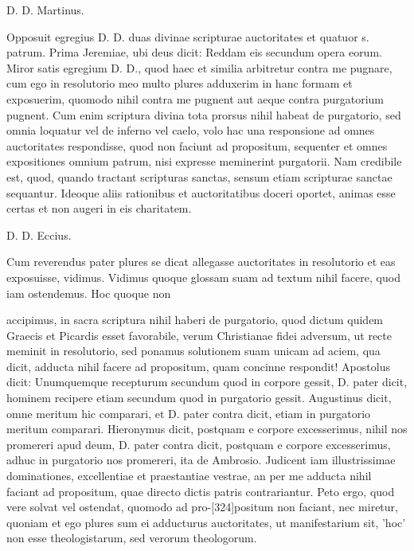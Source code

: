 D. D. Martinus.

Opposuit egregius D. D. duas divinae scripturae auctoritates et quatuor s. patrum. Prima Jeremiae, ubi deus dicit: Reddam eis secundum opera eorum. Miror satis egregium D. D., quod haec et similia arbitretur contra me pugnare, cum ego in resolutorio meo multo plures adduxerim in hanc formam et exposuerim, quomodo nihil contra me pugnent aut aeque contra purgatorium pugnent. Cum enim scriptura divina tota prorsus nihil habeat de purgatorio, sed omnia loquatur vel de inferno vel caelo, volo hac una responsione ad omnes auctoritates respondisse, quod non faciunt ad propositum, sequenter et omnes expositiones omnium patrum, nisi expresse meminerint purgatorii. Nam credibile est, quod, quando tractant scripturas sanctas, sensum etiam scripturae sanctae sequantur. Ideoque aliis rationibus et auctoritatibus doceri oportet, animas esse certas et non augeri in eis charitatem.

D. D. Eccius.

Cum reverendus pater plures se dicat allegasse auctoritates in resolutorio et eas exposuisse, vidimus. Vidimus quoque glossam suam ad textum nihil facere, quod iam ostendemus. Hoc quoque non

accipimus, in sacra scriptura nihil haberi de purgatorio, quod dictum quidem Graecis et Picardis esset favorabile, verum Christianae fidei adversum, ut recte meminit in resolutorio, sed ponamus solutionem suam unicam ad aciem, qua dicit, adducta nihil facere ad propositum, quam concinne respondit! Apostolus dicit: Unumquemque recepturum secundum quod in corpore gessit, D. pater dicit, hominem recipere etiam secundum quod in purgatorio gessit. Augustinus dicit, omne meritum hic comparari, et D. pater contra dicit, etiam in purgatorio meritum comparari. Hieronymus dicit, postquam e corpore excesserimus, nihil nos promereri apud deum, D. pater contra dicit, postquam e corpore excesserimus, adhuc in purgatorio nos promereri, ita de Ambrosio. Judicent iam illustrissimae dominationes, excellentiae et praestantiae vestrae, an per me adducta nihil faciant ad propositum, quae directo dictis patris contrariantur. Peto ergo, quod vere solvat vel ostendat, quomodo ad pro-[324]positum non faciant, nec miretur, quoniam et ego plures sum ei adducturus auctoritates, ut manifestarium sit, 'hoc' non esse theologistarum, sed verorum theologorum.

